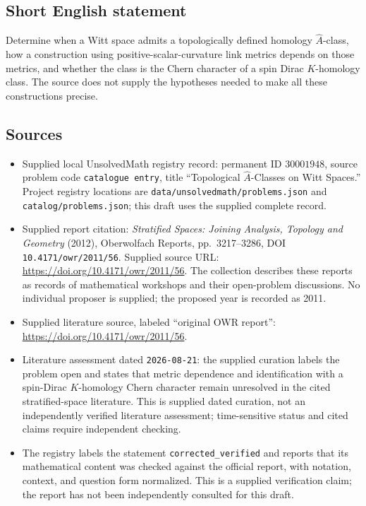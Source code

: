 \documentclass[11pt]{article}
\begin{document}
\subsection{Short English statement}
Determine when a Witt space admits a topologically defined homology \(\widehat A\)-class, how a construction using positive-scalar-curvature link metrics depends on those metrics, and whether the class is the Chern character of a spin Dirac \(K\)-homology class. The source does not supply the hypotheses needed to make all these constructions precise.
\subsection{Sources}
\begin{itemize}
\item Supplied local UnsolvedMath registry record: permanent ID \(30001948\), source problem code \texttt{catalogue entry}, title ``Topological \(\widehat A\)-Classes on Witt Spaces.'' Project registry locations are \texttt{data/unsolvedmath/problems.json} and \texttt{catalog/problems.json}; this draft uses the supplied complete record.
\item Supplied report citation: \emph{Stratified Spaces: Joining Analysis, Topology and Geometry} (2012), Oberwolfach Reports, pp.\ 3217--3286, DOI \texttt{10.4171/owr/2011/56}. Supplied source URL: \url{https://doi.org/10.4171/owr/2011/56}. The collection describes these reports as records of mathematical workshops and their open-problem discussions. No individual proposer is supplied; the proposed year is recorded as 2011.
\item Supplied literature source, labeled ``original OWR report'': \url{https://doi.org/10.4171/owr/2011/56}.
\item Literature assessment dated \texttt{2026-08-21}: the supplied curation labels the problem open and states that metric dependence and identification with a spin-Dirac \(K\)-homology Chern character remain unresolved in the cited stratified-space literature. This is supplied dated curation, not an independently verified literature assessment; time-sensitive status and cited claims require independent checking.
\item The registry labels the statement \texttt{corrected\_verified} and reports that its mathematical content was checked against the official report, with notation, context, and question form normalized. This is a supplied verification claim; the report has not been independently consulted for this draft.
\end{itemize}
\end{document}

